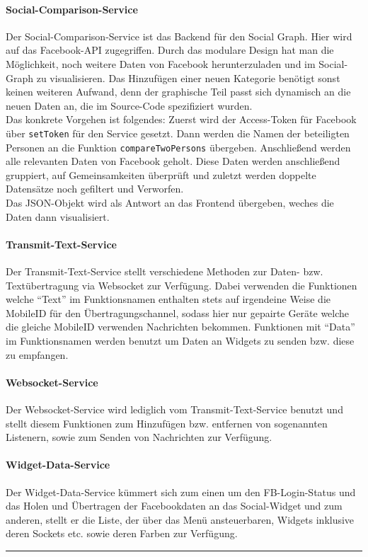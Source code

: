 \documentclass[10pt,a4paper]{report}
\newcommand{\HRule}{\rule{\linewidth}{0.1pt}} %
\begin{document}
				\paragraph{Social-Comparison-Service}
					Der Social-Comparison-Service ist das Backend für den Social Graph. Hier wird auf das Facebook-API zugegriffen. Durch das modulare Design hat man die Möglichkeit, noch weitere Daten von Facebook herunterzuladen und im Social-Graph zu visualisieren. Das Hinzufügen einer neuen Kategorie benötigt sonst keinen weiteren Aufwand, denn der graphische Teil passt sich dynamisch an die neuen Daten an, die im Source-Code spezifiziert wurden.\\
					Das konkrete Vorgehen ist folgendes: Zuerst wird der Access-Token für Facebook über \texttt{setToken} für den Service gesetzt. Dann werden die Namen der beteiligten Personen an die Funktion \texttt{compare\-Two\-Persons} übergeben. Anschließend werden alle relevanten Daten von Facebook geholt. Diese Daten werden anschließend gruppiert, auf Gemeinsamkeiten überprüft und zuletzt werden doppelte Datensätze noch gefiltert und Verworfen.\\
					Das JSON-Objekt wird als Antwort an das Frontend übergeben, weches die Daten dann visualisiert.
				\paragraph{Transmit-Text-Service}
					Der Transmit-Text-Service stellt verschiedene Methoden zur Daten- bzw. Textübertragung via Websocket zur Verfügung. Dabei verwenden die Funktionen welche "`Text"' im Funktionsnamen enthalten stets auf irgendeine Weise die MobileID für den Über\-trag\-ungs\-chan\-nel, sodass hier nur gepairte Geräte welche die gleiche MobileID verwenden Nachrichten bekommen. Funktionen mit "`Data"' im Funktionsnamen werden benutzt um Daten an Widgets zu senden bzw. diese zu empfangen.
				\paragraph{Websocket-Service}
					Der Websocket-Service wird lediglich vom Transmit-Text-Service benutzt und stellt diesem Funktionen zum Hinzufügen bzw. entfernen von sogenannten Listenern, sowie zum Senden von Nachrichten zur Verfügung.
				\paragraph{Widget-Data-Service}
					Der Widget-Data-Service kümmert sich zum einen um den FB-Login-Status und das Holen und Übertragen der Facebookdaten an das Social-Widget und zum anderen, stellt er die Liste, der über das Menü ansteuerbaren, Widgets inklusive deren Sockets etc. sowie deren Farben zur Verfügung.\\
					\HRule
\end{document}

